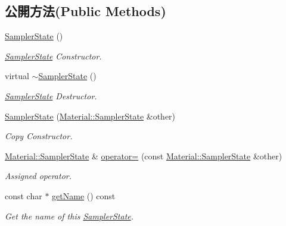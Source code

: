 \subsection*{公開方法(Public Methods)}
\begin{DoxyCompactItemize}
\item 
\hyperlink{class_i_dream_sky_1_1_material_1_1_sampler_state_a983a567b70e790865bfedfb8547b51d5}{Sampler\+State} ()
\begin{DoxyCompactList}\small\item\em \hyperlink{class_i_dream_sky_1_1_material_1_1_sampler_state}{Sampler\+State} Constructor. \end{DoxyCompactList}\item 
virtual \hyperlink{class_i_dream_sky_1_1_material_1_1_sampler_state_a616ede01faa3bb0f3d87cf92f8e36f3f}{$\sim$\+Sampler\+State} ()
\begin{DoxyCompactList}\small\item\em \hyperlink{class_i_dream_sky_1_1_material_1_1_sampler_state}{Sampler\+State} Destructor. \end{DoxyCompactList}\item 
\hyperlink{class_i_dream_sky_1_1_material_1_1_sampler_state_a5746f28f616efc0af967afbda6a52a5d}{Sampler\+State} (\hyperlink{class_i_dream_sky_1_1_material_1_1_sampler_state}{Material\+::\+Sampler\+State} \&other)
\begin{DoxyCompactList}\small\item\em Copy Constructor. \end{DoxyCompactList}\item 
\hyperlink{class_i_dream_sky_1_1_material_1_1_sampler_state}{Material\+::\+Sampler\+State} \& \hyperlink{class_i_dream_sky_1_1_material_1_1_sampler_state_ab8f367f7ff72c553fc817dce20f1a0b0}{operator=} (const \hyperlink{class_i_dream_sky_1_1_material_1_1_sampler_state}{Material\+::\+Sampler\+State} \&other)
\begin{DoxyCompactList}\small\item\em Assigned operator. \end{DoxyCompactList}\item 
const char $\ast$ \hyperlink{class_i_dream_sky_1_1_material_1_1_sampler_state_a735b8048ed883a4b48582bf7e7d87cd9}{get\+Name} () const 
\begin{DoxyCompactList}\small\item\em Get the name of this \hyperlink{class_i_dream_sky_1_1_material_1_1_sampler_state}{Sampler\+State}. \end{DoxyCompactList}\item 

\end{DoxyCompactItemize}
